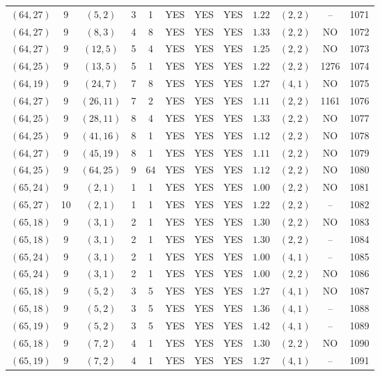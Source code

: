 \begin{longtable}{|c|c|c|c|c|c|c|c|c|c|c|c|}
$(64,27)$ & 9 & $(5,2)$ & 3 & 1 & YES & YES & YES & $1.22$ & $(2,2)$ & -- & 1071\\
$(64,27)$ & 9 & $(8,3)$ & 4 & 8 & YES & YES & YES & $1.33$ & $(2,2)$ & NO & 1072\\
$(64,27)$ & 9 & $(12,5)$ & 5 & 4 & YES & YES & YES & $1.25$ & $(2,2)$ & NO & 1073\\
$(64,25)$ & 9 & $(13,5)$ & 5 & 1 & YES & YES & YES & $1.22$ & $(2,2)$ & 1276 & 1074\\
$(64,19)$ & 9 & $(24,7)$ & 7 & 8 & YES & YES & YES & $1.27$ & $(4,1)$ & NO & 1075\\
$(64,27)$ & 9 & $(26,11)$ & 7 & 2 & YES & YES & YES & $1.11$ & $(2,2)$ & 1161 & 1076\\
$(64,25)$ & 9 & $(28,11)$ & 8 & 4 & YES & YES & YES & $1.33$ & $(2,2)$ & NO & 1077\\
$(64,25)$ & 9 & $(41,16)$ & 8 & 1 & YES & YES & YES & $1.12$ & $(2,2)$ & NO & 1078\\
$(64,27)$ & 9 & $(45,19)$ & 8 & 1 & YES & YES & YES & $1.11$ & $(2,2)$ & NO & 1079\\
$(64,25)$ & 9 & $(64,25)$ & 9 & 64 & YES & YES & YES & $1.12$ & $(2,2)$ & NO & 1080\\
$(65,24)$ & 9 & $(2,1)$ & 1 & 1 & YES & YES & YES & $1.00$ & $(2,2)$ & NO & 1081\\
$(65,27)$ & 10 & $(2,1)$ & 1 & 1 & YES & YES & YES & $1.22$ & $(2,2)$ & -- & 1082\\
$(65,18)$ & 9 & $(3,1)$ & 2 & 1 & YES & YES & YES & $1.30$ & $(2,2)$ & NO & 1083\\
$(65,18)$ & 9 & $(3,1)$ & 2 & 1 & YES & YES & YES & $1.30$ & $(2,2)$ & -- & 1084\\
$(65,24)$ & 9 & $(3,1)$ & 2 & 1 & YES & YES & YES & $1.00$ & $(4,1)$ & -- & 1085\\
$(65,24)$ & 9 & $(3,1)$ & 2 & 1 & YES & YES & YES & $1.00$ & $(2,2)$ & NO & 1086\\
$(65,18)$ & 9 & $(5,2)$ & 3 & 5 & YES & YES & YES & $1.27$ & $(4,1)$ & NO & 1087\\
$(65,18)$ & 9 & $(5,2)$ & 3 & 5 & YES & YES & YES & $1.36$ & $(4,1)$ & -- & 1088\\
$(65,19)$ & 9 & $(5,2)$ & 3 & 5 & YES & YES & YES & $1.42$ & $(4,1)$ & -- & 1089\\
$(65,18)$ & 9 & $(7,2)$ & 4 & 1 & YES & YES & YES & $1.30$ & $(2,2)$ & NO & 1090\\
$(65,19)$ & 9 & $(7,2)$ & 4 & 1 & YES & YES & YES & $1.27$ & $(4,1)$ & -- & 1091\\

\end{longtable}
